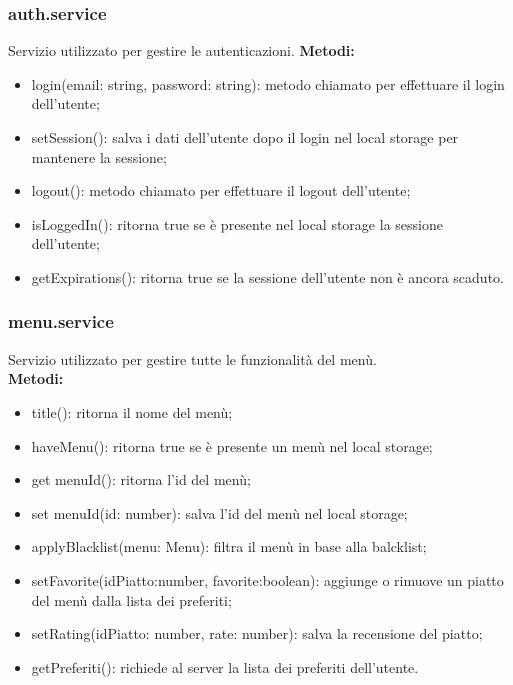 \subsubsection{auth.service}
Servizio utilizzato per gestire le autenticazioni.
\textbf{Metodi:}
\begin{itemize}
    \item login(email: string, password: string): metodo chiamato per effettuare il login dell'utente;
    \item setSession(): salva i dati dell'utente dopo il login nel local storage per mantenere la sessione;
    \item logout(): metodo chiamato per effettuare il logout dell'utente;
    \item isLoggedIn(): ritorna true se è presente nel local storage la sessione dell'utente;
    \item getExpirations(): ritorna true se la sessione dell'utente non è ancora scaduto.
\end{itemize}

\subsubsection{menu.service}
Servizio utilizzato per gestire tutte le funzionalità del menù.\\
\textbf{Metodi:}
\begin{itemize}
    \item title(): ritorna il nome del menù;
    \item haveMenu(): ritorna true se è presente un menù nel local storage;
    \item get menuId(): ritorna l'id del menù;
    \item set menuId(id: number): salva l'id del menù nel local storage;
    \item applyBlacklist(menu: Menu): filtra il menù in base alla balcklist;
    \item setFavorite(idPiatto:number, favorite:boolean): aggiunge o rimuove un piatto del menù dalla lista dei preferiti;
    \item  setRating(idPiatto: number, rate: number): salva la recensione del piatto;
    \item getPreferiti(): richiede al server la lista dei preferiti dell'utente.
\end{itemize}

